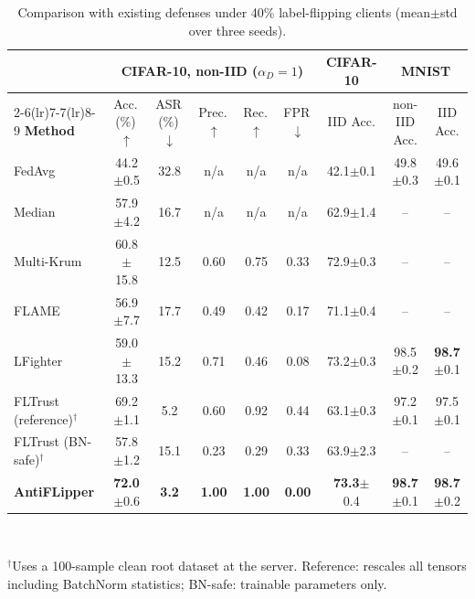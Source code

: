 \begin{table}[t]
\centering
\caption{Comparison with existing defenses under 40\% label-flipping clients (mean$\pm$std over three seeds).}
\label{tab:main}
\footnotesize
\setlength{\tabcolsep}{4.5pt}
\begin{tabular}{@{}l ccccc c cc@{}}
\toprule
& \multicolumn{5}{c}{\textbf{CIFAR-10, non-IID} ($\alpha_D{=}1$)} & \textbf{CIFAR-10} & \multicolumn{2}{c}{\textbf{MNIST}} \\
\cmidrule(lr){2-6}\cmidrule(lr){7-7}\cmidrule(lr){8-9}
\textbf{Method} & Acc.\,(\%)\,$\uparrow$ & ASR\,(\%)\,$\downarrow$ & Prec.\,$\uparrow$ & Rec.\,$\uparrow$ & FPR\,$\downarrow$ & IID Acc. & non-IID Acc. & IID Acc. \\
\midrule
FedAvg & 44.2{\scriptsize$\pm$0.5} & 32.8 & n/a & n/a & n/a & 42.1{\scriptsize$\pm$0.1} & 49.8{\scriptsize$\pm$0.3} & 49.6{\scriptsize$\pm$0.1} \\
Median & 57.9{\scriptsize$\pm$4.2} & 16.7 & n/a & n/a & n/a & 62.9{\scriptsize$\pm$1.4} & -- & -- \\
Multi-Krum & 60.8{\scriptsize$\pm$15.8} & 12.5 & 0.60 & 0.75 & 0.33 & 72.9{\scriptsize$\pm$0.3} & -- & -- \\
FLAME & 56.9{\scriptsize$\pm$7.7} & 17.7 & 0.49 & 0.42 & 0.17 & 71.1{\scriptsize$\pm$0.4} & -- & -- \\
LFighter & 59.0{\scriptsize$\pm$13.3} & 15.2 & 0.71 & 0.46 & 0.08 & 73.2{\scriptsize$\pm$0.3} & 98.5{\scriptsize$\pm$0.2} & \textbf{98.7}{\scriptsize$\pm$0.1} \\
FLTrust (reference)$^{\dagger}$ & 69.2{\scriptsize$\pm$1.1} & 5.2 & 0.60 & 0.92 & 0.44 & 63.1{\scriptsize$\pm$0.3} & 97.2{\scriptsize$\pm$0.1} & 97.5{\scriptsize$\pm$0.1} \\
FLTrust (BN-safe)$^{\dagger}$ & 57.8{\scriptsize$\pm$1.2} & 15.1 & 0.23 & 0.29 & 0.33 & 63.9{\scriptsize$\pm$2.3} & -- & -- \\
\midrule
\textbf{AntiFLipper} & \textbf{72.0}{\scriptsize$\pm$0.6} & \textbf{3.2} & \textbf{1.00} & \textbf{1.00} & \textbf{0.00} & \textbf{73.3}{\scriptsize$\pm$0.4} & \textbf{98.7}{\scriptsize$\pm$0.1} & \textbf{98.7}{\scriptsize$\pm$0.2} \\
\bottomrule
\end{tabular}
\\[2pt]\parbox{\linewidth}{\scriptsize $^{\dagger}$Uses a 100-sample clean root dataset at the server. Reference: rescales all tensors including BatchNorm statistics; BN-safe: trainable parameters only.}
\end{table}
